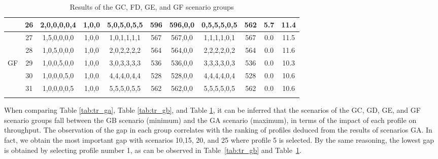 \documentclass[review,12pt, 3p, times]{elsarticle}
\begin{document}
\begin{longtable}{|c|c|c|c|c|c|c|c|c|c|c|}
	        & 26      & 2,0,0,0,0,4                         & 1,0,0                                & 5,0,5,0,5,5          & 596          & 596,0,0               & 0,5,5,5,0,5                                & 562                     & 5.7    &  11.4     \\
	\hline
	        & 27      & 1,5,0,0,0,0                         & 1,0,0                                & 1,0,1,1,1,1          & 567          & 567,0,0               & 1,1,1,1,0,1                                & 567                     & 0.0     &  11.5    \\
	        & 28      & 1,0,5,0,0,0                         & 1,0,0                                & 2,0,2,2,2,2          & 564          & 564,0,0               & 2,2,2,2,0,2                                & 564                     & 0.0     &  11.6    \\
	GF      & 29      & 1,0,0,5,0,0                         & 1,0,0                                & 3,0,3,3,3,3          & 536          & 536,0,0               & 3,3,3,3,0,3                                & 536                     & 0.0     &  10.3   \\
	        & 30      & 1,0,0,0,5,0                         & 1,0,0                                & 4,4,4,0,4,4          & 528          & 528,0,0               & 4,4,4,4,0,4                                & 528                     & 0.0    &  10.6    \\
	        & 31      & 1,0,0,0,0,5                         & 1,0,0                                & 5,5,5,0,5,5          & 562          & 562,0,0               & 5,5,5,5,0,5                                & 562                     & 0.0     &  10.6   \\
	\hline
	\caption{Results of the GC, FD, GE, and GF scenario groups} 				
	\label{tab:tr_gcdef}
\end{longtable}
					
When comparing Table \ref{tab:tr_ga}, Table \ref{tab:tr_gb}, and Table \ref{tab:tr_gcdef}, it can be inferred that the scenarios of the GC, GD, GE, and GF scenario groups fall between the GB scenario (minimum) and the GA scenario (maximum), in terms of the impact of each profile on throughput.
The observation of the gap in each group correlates with the ranking of profiles deduced from the results of scenarios GA. In fact, we obtain  the most important gap  with scenarios 10,15, 20, and 25 where profile 5 is selected. By the same reasoning, the lowest gap is obtained by selecting profile number 1, as can be observed in Table~\ref{tab:tr_gb} and Table~\ref{tab:tr_gcdef}.    
			
\end{document}
